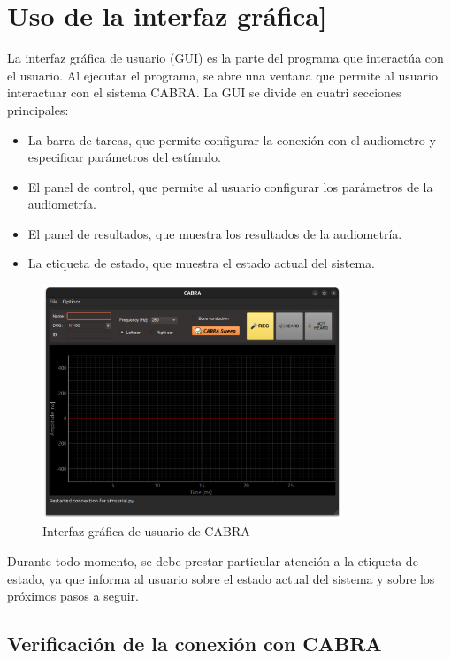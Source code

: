\section{Uso de la interfaz gráfica]} \label{GUI}

La interfaz gráfica de usuario (GUI) es la parte del programa que interactúa con el usuario.
Al ejecutar el programa, se abre una ventana que permite al usuario interactuar con el sistema CABRA.
La GUI se divide en cuatri secciones principales:
\begin{itemize}
    \item La barra de tareas, que permite configurar la conexión con el audiometro y especificar parámetros del
    estímulo.
    \item El panel de control, que permite al usuario configurar los parámetros de la audiometría.
    \item El panel de resultados, que muestra los resultados de la audiometría.
    \item La etiqueta de estado, que muestra el estado actual del sistema.
\end{itemize}

\begin{figure}[H]
    \centering
    \includegraphics[width=0.8\textwidth]{figuras/gui_basic.png}
    \caption{Interfaz gráfica de usuario de CABRA}
    \label{fig:GUI_basic}
\end{figure}

Durante todo momento, se debe prestar particular atención a la etiqueta de estado, ya que informa al usuario sobre
el estado actual del sistema y sobre los próximos pasos a seguir.

\subsection{Verificación de la conexión con CABRA}

